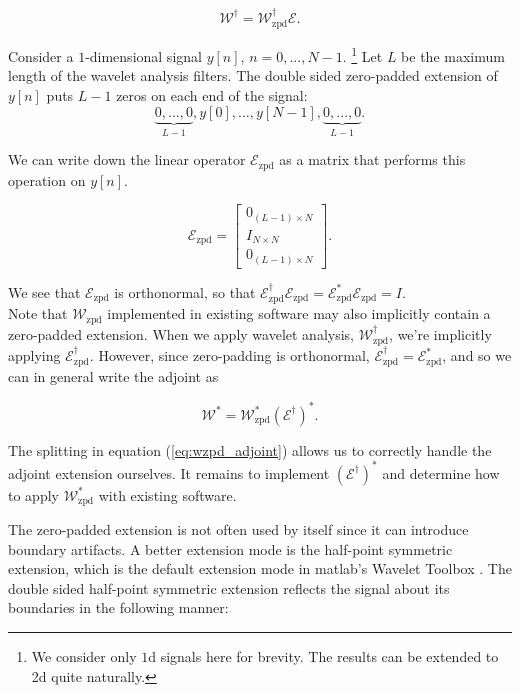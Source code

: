 \documentclass[journal]{IEEEtran}
\begin{document}
\[ \mathcal{W}^\dagger = \mathcal{W}^\dagger_\text{zpd}\mathcal{E}. \] 

Consider a $1$-dimensional signal $y[n]$, $n=0,...,N-1$.  \footnote{We consider only $1$d signals here for brevity.  The results can be extended to 2d quite naturally.}  Let $L$ be the maximum length of the wavelet analysis filters.  The double sided zero-padded extension of $y[n]$ puts $L-1$ zeros on each end of the signal:
\[ \underbrace{0, ..., 0}_{L-1}, y[0], ..., y[N-1], \underbrace{0, ..., 0}_{L-1}. \]

\noindent We can write down the linear operator $\mathcal{E}_\text{zpd}$ as a matrix that performs this operation on $y[n]$.

\[ \mathcal{E}_\text{zpd} = \begin{bmatrix} 0_{(L-1)\times N}\\ I_{N\times N}\\ 0_{(L-1)\times N}\end{bmatrix}. \] 

   \noindent We see that $\mathcal{E}_\text{zpd}$ is orthonormal, so that ${\mathcal{E}_\text{zpd}^\dagger\mathcal{E}_\text{zpd} = \mathcal{E}_\text{zpd}^\ast\mathcal{E}_\text{zpd}=I}$.\\

   Note that $\mathcal{W}_\text{zpd}$ implemented in existing software may also implicitly contain a zero-padded extension.  When we apply wavelet analysis, $\mathcal{W}_\text{zpd}^\dagger$, we're implicitly applying $\mathcal{E}_\text{zpd}^\dagger$.  However, since zero-padding is orthonormal, $\mathcal{E}_\text{zpd}^\dagger=\mathcal{E}_\text{zpd}^\ast$, and so we can in general write the adjoint as 

\begin{equation}
\label{eq:wzpd_adjoint}
\mathcal{W}^\ast = \mathcal{W}_\text{zpd}^\ast\left(\mathcal{E}^\dagger\right)^\ast.
\end{equation}

\noindent The splitting in equation (\ref{eq:wzpd_adjoint}) allows us to correctly handle the adjoint extension ourselves.  It remains to implement $\left(\mathcal{E}^\dagger\right)^\ast$ and determine how to apply $\mathcal{W}^\ast_\text{zpd}$ with existing software.

The zero-padded extension is not often used by itself since it can introduce boundary artifacts.
 A better extension mode is the half-point symmetric extension, which is the default extension mode in {\sc matlab}'s Wavelet Toolbox \cite{matlab_wt_2015}.  The double sided half-point symmetric extension reflects the signal about its boundaries in the following manner:
\end{document}
